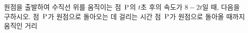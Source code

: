 원점을 출발하여 수직선 위를 움직이는 점~$\mathrm{P}$의 $t$초 후의 속도가 $8-2t$일 때, 다음을 구하시오.
 점~$\mathrm{P}$가 원점으로 돌아오는 데 걸리는 시간
 점~$\mathrm{P}$가 원점으로 돌아올 때까지 움직인 거리
